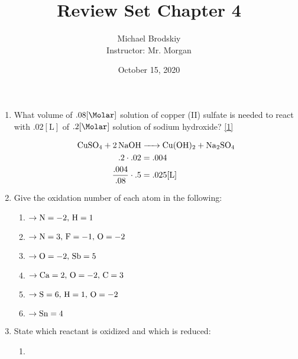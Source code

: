 \documentclass[12pt]{article}
\title{Review Set Chapter 4}
\date{October 15, 2020}
\author{Michael Brodskiy\\ \small Instructor: Mr. Morgan}
\begin{document}
\maketitle

\begin{enumerate}

  \item What volume of $.08[\si{\Molar}]$ solution of copper (II) sulfate is needed to react with $.02[\si{\liter}]$ of $.2[\si{\Molar}]$ solution of sodium hydroxide? \eqref{1}

    \begin{equation}
      \begin{split}
        \ce{CuSO4 + 2NaOH } & \ce{-> Cu(OH)2 + Na2SO4}\\
        .2\cdot.02 & = .004\\
        \frac{.004}{.08}\cdot .5 & = .025[\si{\liter}]
      \end{split}
      \label{1}
    \end{equation}

  \item Give the oxidation number of each atom in the following:

    \begin{enumerate}

      \item {} $\rightarrow \ce{N}=-2,\,\ce{H}=1$

      \item {} $\rightarrow \ce{N}=3,\,\ce{F}=-1,\,\ce{O}=-2$

      \item {} $\rightarrow \ce{O}=-2,\,\ce{Sb}=5$

      \item {} $\rightarrow \ce{Ca}=2,\,\ce{O}=-2,\,\ce{C}=3$

      \item {} $\rightarrow \ce{S}=6,\,\ce{H}=1,\,\ce{O}=-2$

      \item {} $\rightarrow \ce{Sn}=4$

    \end{enumerate}

  \item State which reactant is oxidized and which is reduced:

    \begin{enumerate}

       \item {}


\end{enumerate}
\end{enumerate}
\end{document}
